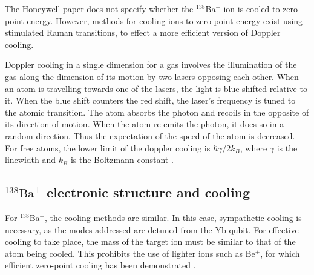 \documentclass[12pt,a4paper]{amsart}
\numberwithin{equation}{section}
\theoremstyle{plain}
\theoremstyle{definition}
\begin{document}
The Honeywell paper does not specify whether the ${}^{138}$Ba$^+$ ion is cooled to zero-point energy. However, methods for cooling ions to zero-point energy exist using stimulated Raman transitions, to effect a more efficient version of Doppler cooling.


Doppler cooling in a single dimension for a gas involves the illumination of the gas along the dimension of its motion by two lasers opposing each other. When an atom is travelling towards one of the lasers, the light is blue-shifted relative to it. When the blue shift counters the red shift, the laser's frequency is tuned to the atomic transition. The atom absorbs the photon and recoils in the opposite of its direction of motion. When the atom re-emits the photon, it does so in a random direction. Thus the expectation of the speed of the atom is decreased. For free atoms, the lower limit of the doppler cooling is $\hbar \gamma / 2 k_B$, where $\gamma $ is the linewidth and $k_B$ is the Boltzmann constant \cite{miscQuanPap4}.


\subsection{${}^{138}\mathrm{Ba}^+$ electronic structure and cooling}


For ${}^{138}$Ba$^+$, the cooling methods are similar. In this case, sympathetic cooling is necessary, as the modes addressed are detuned from the Yb qubit. For effective cooling to take place, the mass of the target ion must be similar to that of the atom being cooled. This prohibits the use of lighter ions such as Be$^+$, for which efficient zero-point cooling has been demonstrated \cite{ioniSympCool, ioniRamaCool}.
\end{document}
